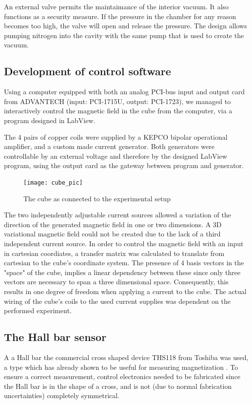 \documentclass[journal]{IEEEtran}
\begin{document}
An external valve permits the maintaimance of the interior vacuum. It also functions as a security measure. If the pressure in the chamber for any reason becomes too high, the valve will open and release the pressure. The design allows pumping nitrogen into the cavity with the same pump that is used to create the vacuum.

\subsection{Development of control software}

Using a computer equipped with both an analog PCI-bus input and output card from ADVANTECH (input: PCI-1715U, output: PCI-1723), we managed to  interactively control the magnetic field in the cube from the computer, via a program designed in LabView.

The 4 pairs of copper coils were supplied by a KEPCO bipolar operational amplifier, and a custom made current generator. Both generators were controllable by an external voltage and therefore by the designed LabView program, using the output card as the gateway between program and generator.

\begin{figure}[H]
\centering
\texttt{[image: cube\_pic]}
\caption{The cube as connected to the experimental setup}
\end{figure}

The two independently adjustable current sources allowed a variation of the direction of the generated magnetic field in one or two dimensions. A 3D variational magnetic field could not be created due to the lack of a third independent current source. In order to control the magnetic field with an input in cartesian coordiates, a transfer matrix was calculated to translate from cartesian to the cube's coordinate system. The presence of 4 basis vectors in the "space" of the cube, implies a linear dependency between these since only three vectors are necessary to span a three dimensional space. Consequently, this results in one degree of freedom when applying a current to the cube.  
The actual wiring of the cube's coils to the used current supplies was dependent on the performed experiment.


 

\subsection{The Hall bar sensor}
A a Hall bar the commercial cross shaped device THS118 from Toshiba was used, a type which has already shown to be useful for measuring magnetization \cite{nishioka}. To ensure a correct measurement, control electronics needed to be fabricated since the Hall bar is in the shape of a cross, and is not (due to normal fabrication uncertainties) completely symmetrical. 
\end{document}
